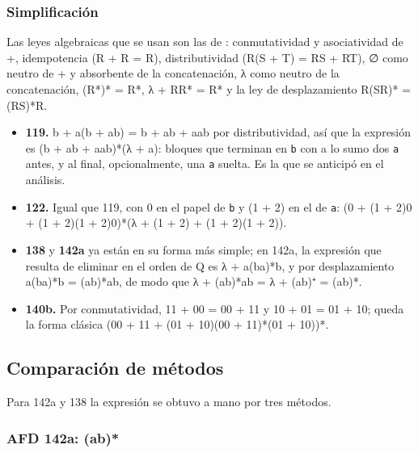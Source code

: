 
\hypertarget{simplificaciuxf3n}{%
\subsubsection{Simplificación}\label{simplificaciuxf3n}}

Las leyes algebraicas que se usan son las de \textcite[sec.~3.4]{hopcroft2007}: conmutatividad y asociatividad de +, idempotencia (R + R = R), distributividad (R(S + T) = RS + RT), ∅ como neutro de + y absorbente de la concatenación, λ como neutro de la concatenación, (R*)* = R*, λ + RR* = R* y la ley de desplazamiento R(SR)* = (RS)*R.

\begin{itemize}
\tightlist
\item
  \textbf{119.} b + a(b + ab) = b + ab + aab por distributividad, así que la expresión es (b + ab + aab)*(λ + a): bloques que terminan en \texttt{b} con a lo sumo dos \texttt{a} antes, y al final, opcionalmente, una \texttt{a} suelta. Es la que se anticipó en el análisis.
\item
  \textbf{122.} Igual que 119, con 0 en el papel de \texttt{b} y (1 + 2) en el de \texttt{a}: (0 + (1 + 2)0 + (1 + 2)(1 + 2)0)*(λ + (1 + 2) + (1 + 2)(1 + 2)).
\item
  \textbf{138} y \textbf{142a} ya están en su forma más simple; en 142a, la expresión que resulta de eliminar en el orden de Q es λ + a(ba)*b, y por desplazamiento a(ba)*b = (ab)*ab, de modo que λ + (ab)*ab = λ + (ab)⁺ = (ab)*.
\item
  \textbf{140b.} Por conmutatividad, 11 + 00 = 00 + 11 y 10 + 01 = 01 + 10; queda la forma clásica (00 + 11 + (01 + 10)(00 + 11)*(01 + 10))*.
\end{itemize}

\hypertarget{comparaciuxf3n-de-muxe9todos}{%
\subsection{Comparación de métodos}\label{comparaciuxf3n-de-muxe9todos}}

Para 142a y 138 la expresión se obtuvo a mano por tres métodos.

\hypertarget{afd-142a-ab}{%
\subsubsection{AFD 142a: (ab)*}\label{afd-142a-ab}}

